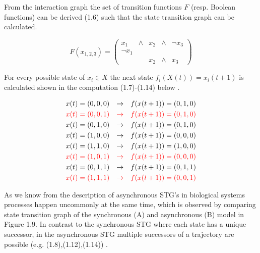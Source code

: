 From the interaction graph the set of transition functions $F$ (resp. Boolean functions) can be derived (1.6) such that the state transition graph can be calculated.

\begin{equation}
F(x_{1,2,3}) = 
\begin{pmatrix}
x_1      & \land & x_2 & \land &\neg x_3\\
\neg x_1 &       &      &       & \\
         &       & x_2  &\land & x_3
\end{pmatrix}
\end{equation}


For every possible state of $x_i\in X$ the next state $f_{i}(X(t))=x_{i}(t+1)$ is calculated shown in the computation (1.7)-(1.14) below \citep{Remy.2008}.


\begin{align}
x(t)& =(0,0,0) &\rightarrow & &f(x(t+1)) = (0,1,0)\\
\color{red}x(t)& \color{red}=(0,0,1) &\color{red}\rightarrow & &\color{red}f(x(t+1)) = (0,1,0)\\
x(t)& =(0,1,0) &\rightarrow & &f(x(t+1)) = (0,1,0)\\
x(t)& =(1,0,0) &\rightarrow & &f(x(t+1)) = (0,0,0)\\
x(t)& =(1,1,0) &\rightarrow & &f(x(t+1)) = (1,0,0)\\
\color{red}x(t)& \color{red}=(1,0,1) &\color{red}\rightarrow & &\color{red}f(x(t+1)) = (0,0,0)\\
x(t)& =(0,1,1) &\rightarrow & &f(x(t+1)) = (0,1,1)\\
\color{red}x(t)& \color{red}=(1,1,1) &\color{red}\rightarrow & &\color{red}f(x(t+1)) = (0,0,1)
\end{align}

As we know from the description of asynchronous STG's in biological systems processes happen uncommonly at the same time, which is observed by comparing state transition graph of the synchronous (A) and asynchronous (B) model in Figure 1.9. In contrast to the synchronous STG where each state has a unique successor, in the asynchronous STG multiple successors of a trajectory are possible (e.g. (1.8),(1.12),(1.14)) \citep{Saadatpour.2013}. 


